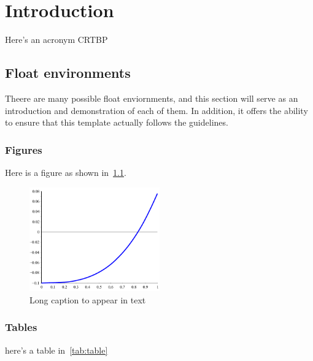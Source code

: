 
\chapter{Introduction} \label{chap:intro}

Here's an acronym \ac{CRTBP}
\section{Float environments}
Theere are many possible float enviornments, and this section will serve as an introduction and demonstration of each of them.
In addition, it offers the ability to ensure that this template actually follows the guidelines.

\subsection{Figures}\label{ssec:figures}


Here is a figure as shown in~\cref{fig:plain}.

\begin{figure}
    \centering
    \includegraphics[width=0.5\textwidth]{figures/f1_plain.pdf}
    \caption[Short caption for TOC]{Long caption to appear in text\label{fig:plain}}
\end{figure}

\subsection{Tables}\label{ssec:tables}

here's a table in~\cref{tab:table}

